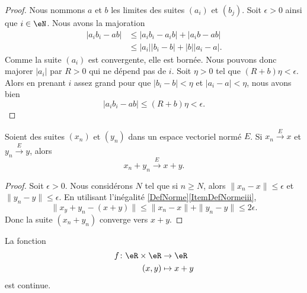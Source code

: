 \begin{proof}
	Nous nommons \( a\) et \( b\) les limites des suites \( (a_i)\) et \( (b_j)\). Soit \( \epsilon>0\) ainsi que \( i\in \eN\). Nous avons la majoration
	\begin{subequations}
		\begin{align}
			| a_ib_i-ab | & \leq | a_ib_i-a_ib |  + | a_ib-ab |       \\
			              & \leq | a_i | |b_i-b | + | b | | a_i-a |.
		\end{align}
	\end{subequations}
	Comme la suite \( (a_i)\) est convergente, elle est bornée. Nous pouvons donc majorer \( | a_i |\) par \( R>0\) qui ne dépend pas de \( i\). Soit \( \eta>0\) tel que \( (R+b)\eta<\epsilon\). Alors en prenant \( i\) assez grand pour que \( | b_i-b |<\eta\) et \( | a_i-a |<\eta\), nous avons bien
	\begin{equation}
		| a_ib_i-ab |\leq (R+b)\eta<\epsilon.
	\end{equation}
\end{proof}

\begin{proposition}     \label{PROPooICZMooGfLdPc}
	Soient des suites \( (x_n)\) et \( (y_n)\) dans un espace vectoriel normé \( E\). Si \( x_n\stackrel{E}{\longrightarrow}x\) et \( y_n\stackrel{E}{\longrightarrow}y\), alors
	\begin{equation}
		x_n+y_n\stackrel{E}{\longrightarrow}x+y.
	\end{equation}
\end{proposition}

\begin{proof}
	Soit \( \epsilon>0\). Nous considérons \( N\) tel que si \( n\geq N\), alors \( \| x_n-x \|\leq \epsilon\) et \( \| y_n-y \|\leq \epsilon\). En utilisant l'inégalité \ref{DefNorme}\ref{ItemDefNormeiii},
	\begin{equation}
		\| x_y+y_n-(x+y) \|\leq \| x_n-x \|+\| y_n-y \|\leq 2\epsilon.
	\end{equation}
	Donc la suite \( (x_n+y_n)\) converge vers \( x+y\).
\end{proof}

\begin{lemma}       \label{LEMooGKIPooWgpFTB}
	La fonction
	\begin{equation}
		\begin{aligned}
			f\colon \eR\times \eR & \to \eR     \\
			(x,y)                 & \mapsto x+y
		\end{aligned}
	\end{equation}
	est continue.
\end{lemma}

